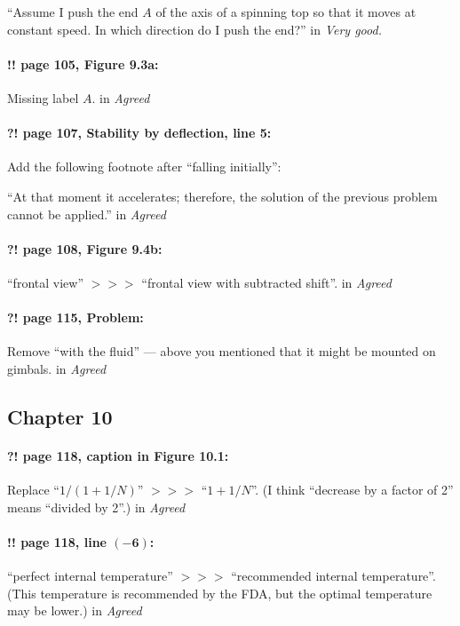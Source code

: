 \documentclass[twoside]{article}
\begin{document}
“Assume I push the end $A$ of the axis of a spinning top so that it moves at constant speed. In which direction do I push the end?”
 in {\it  Very good.} 


\paragraph{!! page 105, Figure 9.3a:} Missing label $A$.
 in {\it  Agreed} 

\paragraph{?! page 107, Stability by deflection, line 5:} Add the following footnote after “falling initially”:

“At that moment it accelerates; therefore, the solution of the previous problem cannot be applied.”
 in {\it  Agreed} 

\paragraph{?! page 108, Figure 9.4b:} “frontal view” $>\!>\!>$ “frontal view with subtracted shift”.
 in {\it  Agreed} 

\paragraph{?! page 115, Problem:} Remove “with the fluid” — above you mentioned that it might be mounted on gimbals.
 in {\it  Agreed} 

\subsection*{Chapter 10}

\paragraph{?! page 118, caption in Figure 10.1:} Replace ``$1/(1+1/N)$'' $>\!>\!>$ ``$1+1/N$''. (I think ``decrease by a factor of 2'' means ``divided by 2''.)
 in {\it  Agreed} 

\paragraph{!! page 118, line $\bm{(-6)}$:} ``perfect internal temperature'' $>\!>\!>$ ``recommended internal temperature''. (This temperature is recommended by the FDA, but the optimal temperature may be lower.)
 in {\it  Agreed} 
\end{document}
